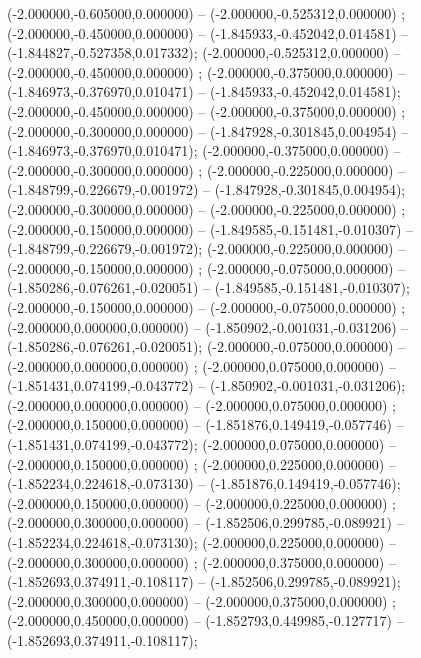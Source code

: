  (-2.000000,-0.605000,0.000000) -- (-2.000000,-0.525312,0.000000) ;
 (-2.000000,-0.450000,0.000000) -- (-1.845933,-0.452042,0.014581) -- (-1.844827,-0.527358,0.017332);
 (-2.000000,-0.525312,0.000000) -- (-2.000000,-0.450000,0.000000) ;
 (-2.000000,-0.375000,0.000000) -- (-1.846973,-0.376970,0.010471) -- (-1.845933,-0.452042,0.014581);
 (-2.000000,-0.450000,0.000000) -- (-2.000000,-0.375000,0.000000) ;
 (-2.000000,-0.300000,0.000000) -- (-1.847928,-0.301845,0.004954) -- (-1.846973,-0.376970,0.010471);
 (-2.000000,-0.375000,0.000000) -- (-2.000000,-0.300000,0.000000) ;
 (-2.000000,-0.225000,0.000000) -- (-1.848799,-0.226679,-0.001972) -- (-1.847928,-0.301845,0.004954);
 (-2.000000,-0.300000,0.000000) -- (-2.000000,-0.225000,0.000000) ;
 (-2.000000,-0.150000,0.000000) -- (-1.849585,-0.151481,-0.010307) -- (-1.848799,-0.226679,-0.001972);
 (-2.000000,-0.225000,0.000000) -- (-2.000000,-0.150000,0.000000) ;
 (-2.000000,-0.075000,0.000000) -- (-1.850286,-0.076261,-0.020051) -- (-1.849585,-0.151481,-0.010307);
 (-2.000000,-0.150000,0.000000) -- (-2.000000,-0.075000,0.000000) ;
 (-2.000000,0.000000,0.000000) -- (-1.850902,-0.001031,-0.031206) -- (-1.850286,-0.076261,-0.020051);
 (-2.000000,-0.075000,0.000000) -- (-2.000000,0.000000,0.000000) ;
 (-2.000000,0.075000,0.000000) -- (-1.851431,0.074199,-0.043772) -- (-1.850902,-0.001031,-0.031206);
 (-2.000000,0.000000,0.000000) -- (-2.000000,0.075000,0.000000) ;
 (-2.000000,0.150000,0.000000) -- (-1.851876,0.149419,-0.057746) -- (-1.851431,0.074199,-0.043772);
 (-2.000000,0.075000,0.000000) -- (-2.000000,0.150000,0.000000) ;
 (-2.000000,0.225000,0.000000) -- (-1.852234,0.224618,-0.073130) -- (-1.851876,0.149419,-0.057746);
 (-2.000000,0.150000,0.000000) -- (-2.000000,0.225000,0.000000) ;
 (-2.000000,0.300000,0.000000) -- (-1.852506,0.299785,-0.089921) -- (-1.852234,0.224618,-0.073130);
 (-2.000000,0.225000,0.000000) -- (-2.000000,0.300000,0.000000) ;
 (-2.000000,0.375000,0.000000) -- (-1.852693,0.374911,-0.108117) -- (-1.852506,0.299785,-0.089921);
 (-2.000000,0.300000,0.000000) -- (-2.000000,0.375000,0.000000) ;
 (-2.000000,0.450000,0.000000) -- (-1.852793,0.449985,-0.127717) -- (-1.852693,0.374911,-0.108117);
